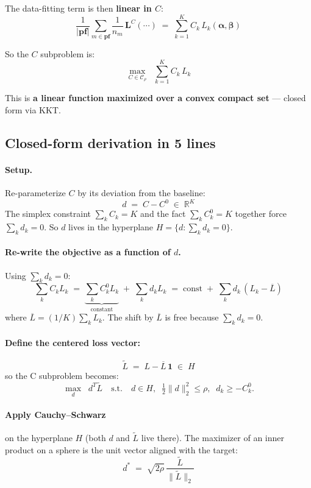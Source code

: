 \documentclass[11pt,a4paper]{article}
\begin{document}
The data-fitting term is then \textbf{linear in $C$}:
\[
\frac{1}{|\mathbf{pf}|}\sum_{m \in \mathbf{pf}}\frac{1}{n_m}\,\mathbf{L}^{C}(\cdots) \;=\; \sum_{k=1}^{K} C_k\,L_k(\boldsymbol{\alpha},\boldsymbol{\beta})
\]

So the $C$ subproblem is:
\begin{equation}
\boxed{\;\max_{C \in \mathcal{C}_\rho}\;\;\sum_{k=1}^{K} C_k\,L_k\;}
\end{equation}

This is \textbf{a linear function maximized over a convex compact set} --- closed form via KKT.

\subsection{Closed-form derivation in 5 lines}

\paragraph{Setup.} Re-parameterize $C$ by its deviation from the baseline:
\[
d \;=\; C - C^{0} \;\in\; \mathbb{R}^{K}
\]
The simplex constraint $\sum_k C_k = K$ and the fact $\sum_k C^0_k = K$ together force $\sum_k d_k = 0$. So $d$ lives in the hyperplane $H = \{d : \sum_k d_k = 0\}$.

\paragraph{Re-write the objective as a function of $d$.} Using $\sum_k d_k = 0$:
\[
\sum_{k} C_k L_k \;=\; \underbrace{\sum_{k} C_k^{0} L_k}_{\text{constant}} \;+\; \sum_{k} d_k L_k \;=\; \text{const} \;+\; \sum_{k} d_k\,(L_k - \overline{L})
\]
where $\overline{L} = (1/K) \sum_k L_k$. The shift by $\overline{L}$ is free because $\sum_k d_k = 0$.

\paragraph{Define the centered loss vector:}
\[
\widetilde{L} \;=\; L - \overline{L}\,\mathbf{1} \;\in\; H
\]
so the C subproblem becomes:
\[
\max_{d}\;\;d^{T}\widetilde{L}\quad\text{s.t.}\quad d \in H,\;\;\tfrac{1}{2}\|d\|_{2}^{2} \leq \rho,\;\;d_k \geq -C^{0}_{k}.
\]

\paragraph{Apply Cauchy--Schwarz} on the hyperplane $H$ (both $d$ and $\widetilde{L}$ live there). The maximizer of an inner product on a sphere is the unit vector aligned with the target:
\[
d^{*} \;=\; \sqrt{2\rho}\,\frac{\widetilde{L}}{\|\widetilde{L}\|_{2}}
\]
\end{document}
